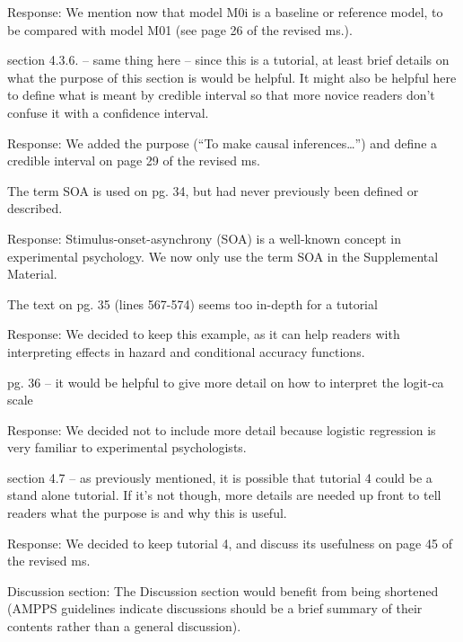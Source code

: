 \documentclass[
]{article}
\renewenvironment{quote}{\begin{leftbar}}{\end{leftbar}}
\begin{document}
Response: We mention now that model M0i is a baseline or reference
model, to be compared with model M01 (see page 26 of the revised ms.).

\begin{quote}
section 4.3.6. -- same thing here -- since this is a tutorial, at least
brief details on what the purpose of this section is would be helpful.
It might also be helpful here to define what is meant by credible
interval so that more novice readers don't confuse it with a confidence
interval.
\end{quote}

Response: We added the purpose (``To make causal inferences\ldots{}'')
and define a credible interval on page 29 of the revised ms.

\begin{quote}
The term SOA is used on pg. 34, but had never previously been defined or
described.
\end{quote}

Response: Stimulus-onset-asynchrony (SOA) is a well-known concept in
experimental psychology. We now only use the term SOA in the
Supplemental Material.

\begin{quote}
The text on pg. 35 (lines 567-574) seems too in-depth for a tutorial
\end{quote}

Response: We decided to keep this example, as it can help readers with
interpreting effects in hazard and conditional accuracy functions.

\begin{quote}
pg. 36 -- it would be helpful to give more detail on how to interpret
the logit-ca scale
\end{quote}

Response: We decided not to include more detail because logistic
regression is very familiar to experimental psychologists.

\begin{quote}
section 4.7 -- as previously mentioned, it is possible that tutorial 4
could be a stand alone tutorial. If it's not though, more details are
needed up front to tell readers what the purpose is and why this is
useful.
\end{quote}

Response: We decided to keep tutorial 4, and discuss its usefulness on
page 45 of the revised ms.

\begin{quote}
Discussion section: The Discussion section would benefit from being
shortened (AMPPS guidelines indicate discussions should be a brief
summary of their contents rather than a general discussion).
\end{quote}
\end{document}
